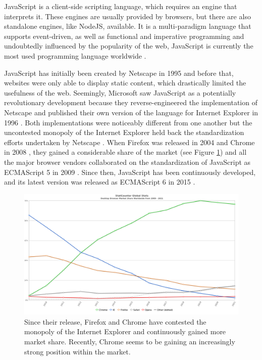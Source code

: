 JavaScript is a client-side scripting language, which requires an engine that interprets it. These engines are usually provided by browsers, but there are also standalone engines, like NodeJS, available. It is a multi-paradigm language that supports event-driven, as well as functional and imperative programming and undoubtedly influenced by the popularity of the web, JavaScript is currently the most used programming language worldwide \parencite{StatisticProgrammingLanguageUsage}.

JavaScript has initially been created by Netscape in 1995 \parencite{JSFirstRelease} and before that, websites were only able to display static content, which drastically limited the usefulness of the web. Seemingly, Microsoft saw JavaScript as a potentially revolutionary development because they reverse-engineered the implementation of Netscape and published their own version of the language for Internet Explorer in 1996 \parencite{JSIERelease}. Both implementations were noticeably different from one another but the uncontested monopoly of the Internet Explorer \parencite{BrowserMarketShareEarly} held back the standardization efforts undertaken by Netscape \parencite{ECMAScript1}. When Firefox was released in 2004 \parencite{FirefoxFirstRelease} and Chrome in 2008 \parencite{ChromeFirstRelease}, they gained a considerable share of the market \parencite{BrowserMarketShare} (see Figure \ref{fig:BrowserMarketShare}) and all the major browser vendors collaborated on the standardization of JavaScript as ECMAScript 5 in 2009 \parencite{ECMAScript5}. Since then, JavaScript has been continuously developed, and its latest version was released as ECMAScript 6 in 2015 \parencite{ECMAScript6}.


\begin{figure}[tp]
    \centering
    \includegraphics[keepaspectratio,width=\linewidth,height=\fullh / 2]
    {images/browser-market-share.png}

    \caption[Desktop Browser Market Share]{
        Since their release, Firefox and Chrome have contested the monopoly of the Internet Explorer and continuously gained more market share. Recently, Chrome seems to be gaining an increasingly strong position within the market.
    }
    \label{fig:BrowserMarketShare}
\end{figure}

